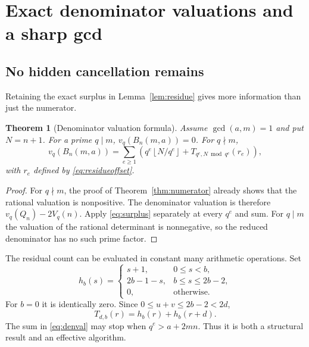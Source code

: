 \documentclass[11pt,a4paper]{article}
\numberwithin{equation}{section}
\newtheorem{theorem}{Theorem}[section]
\theoremstyle{definition}
\theoremstyle{remark}
\newcommand{\floor}[1]{\left\lfloor#1\right\rfloor}
\begin{document}
\section{Exact denominator valuations and a sharp gcd}\label{sec:denominators}

\subsection{No hidden cancellation remains}
Retaining the exact surplus in Lemma~\ref{lem:residue} gives more information than just the numerator.

\begin{theorem}[Denominator valuation formula]\label{thm:denval}
Assume $\gcd(a,m)=1$ and put $N=n+1$. For a prime $q\mid m$, $v_q(B_n(m,a))=0$. For $q\nmid m$,
\begin{equation}\label{eq:denval}
 v_q(B_n(m,a))=
 \sum_{e\geq1}\left(
 q^e\floor{N/q^e}
 +T_{q^e,N\bmod q^e}(r_e)\right),
\end{equation}
with $r_e$ defined by \eqref{eq:residueoffset}.
\end{theorem}
\begin{proof}
For $q\nmid m$, the proof of Theorem~\ref{thm:numerator} already shows that the rational valuation is nonpositive. The denominator valuation is therefore
$v_q(Q_n)-2V_q(n)$. Apply \eqref{eq:surplus} separately at every $q^e$ and sum. For $q\mid m$ the valuation of the rational determinant is nonnegative, so the reduced denominator has no such prime factor.
\end{proof}

The residual count can be evaluated in constant many arithmetic operations. Set
\[
 h_b(s)=
 \begin{cases}
 s+1,&0\leq s<b,\\
 2b-1-s,&b\leq s\leq2b-2,\\
 0,&\text{otherwise}.
 \end{cases}
\]
For $b=0$ it is identically zero. Since $0\leq u+v\leq2b-2<2d$,
\begin{equation}\label{eq:Ttriangle}
 T_{d,b}(r)=h_b(r)+h_b(r+d).
\end{equation}
The sum in \eqref{eq:denval} may stop when $q^e>a+2mn$. Thus it is both a structural result and an effective algorithm.
\end{document}
